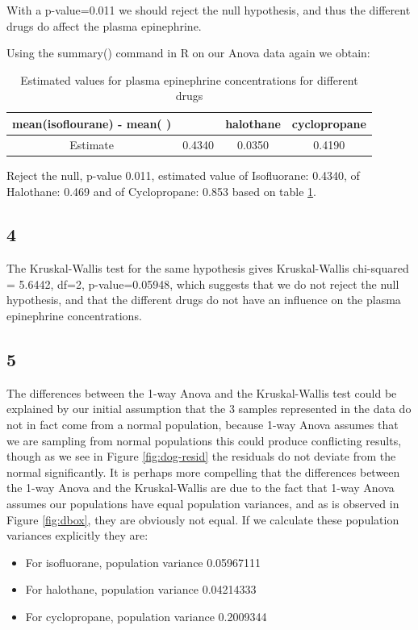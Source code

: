 \documentclass{article}
\begin{document}
    With a p-value=0.011 we should reject the null hypothesis, and thus the different drugs do affect the plasma epinephrine.
    
    Using the summary() command in R on our Anova data again we obtain:
    
    \begin{table}[H]
    \begin{center}
    \begin{tabular}{c|c|c|c|}
        \hline 
        mean(isoflourane) - mean( )&  & halothane  & cyclopropane \\
        \hline
        Estimate & 0.4340 & 0.0350 & 0.4190\\
        \hline
    \end{tabular}
    \caption{Estimated values for plasma epinephrine concentrations for different drugs}
    \label{table:doganova}
    \end{center}
    \end{table}
    
    Reject the null, p-value 0.011, estimated value of Isofluorane: 0.4340, of Halothane: 0.469 and of Cyclopropane: 0.853 based on table \ref{table:doganova}.
    
    \subsection*{4}
    
    The Kruskal-Wallis test for the same hypothesis gives Kruskal-Wallis chi-squared = 5.6442, df=2, p-value=0.05948, which suggests that we do not reject the null hypothesis, and that the different drugs do not have an influence on the plasma epinephrine concentrations.
     
    \subsection*{5}
    The differences between the 1-way Anova and the Kruskal-Wallis test could be explained by our initial assumption that the 3 samples represented in the data do not in fact come from a normal population, because 1-way Anova assumes that we are sampling from normal populations this could produce conflicting results, though as we see in Figure \ref{fig:dog-resid} the residuals do not deviate from the normal significantly.
    It is perhaps more compelling that the differences between the 1-way Anova and the Kruskal-Wallis are due to the fact that 1-way Anova assumes our populations have equal population variances, and as is observed in Figure \ref{fig:dbox}, they are obviously not equal. If we calculate these population variances explicitly they are:
    \begin{itemize}
    \item For isofluorane, population variance 0.05967111
    \item For halothane, population variance 0.04214333
    \item For cyclopropane, population variance 0.2009344 
    \end{itemize}
    
\end{document}
